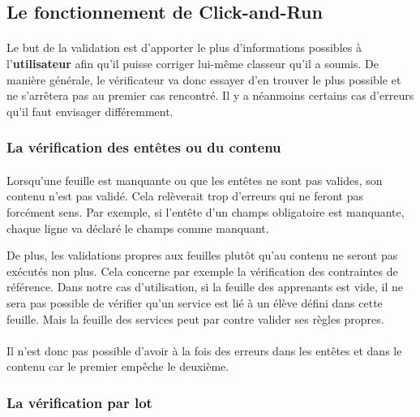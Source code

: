 \subsection{Le fonctionnement de Click-and-Run}
\label{subsec:operation}

\paragraph{}
Le but de la validation est d'apporter le plus d'informations possibles à l'\textbf{utilisateur} afin qu'il puisse corriger lui-même classeur qu'il a soumis.
De manière générale, le vérificateur va donc essayer d'en trouver le plus possible et ne s'arrêtera pas au premier cas rencontré.
Il y a néanmoins certains cas d'erreurs qu'il faut envisager différemment.

\subsubsection{La vérification des entêtes ou du contenu}
\label{subsubsec:headers-validation}

\paragraph{}
Lorsqu'une feuille est manquante ou que les entêtes ne sont pas valides, son contenu n'est pas validé.
Cela relèverait trop d'erreurs qui ne feront pas forcément sens.
Par exemple, si l'entête d'un champs obligatoire est manquante, chaque ligne va déclaré le champs comme manquant.

De plus, les validations propres aux feuilles plutôt qu'au contenu ne seront pas exécutés non plus.
Cela concerne par exemple la vérification des contraintes de référence.
Dans notre cas d'utilisation, si la feuille des apprenants est vide, il ne sera pas possible de vérifier qu'un service est lié à un élève défini dans cette feuille.
Mais la feuille des services peut par contre valider ses règles propres.

\paragraph{}
Il n'est donc pas possible d'avoir à la fois des erreurs dans les entêtes et dans le contenu car le premier empêche le deuxième.

\subsubsection{La vérification par lot}
\label{subsubsec:batch-validation}

